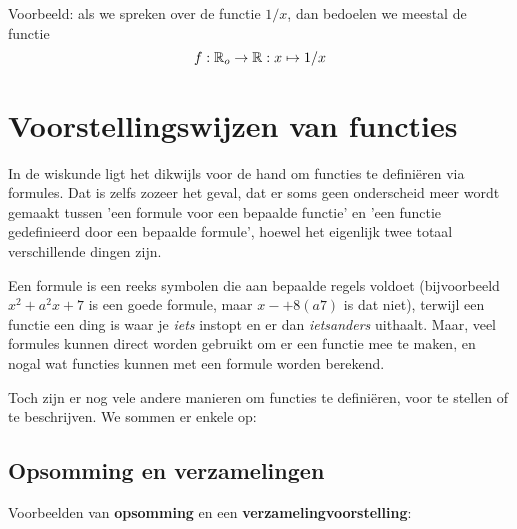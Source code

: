 \documentclass{ximera}
\begin{document}
Voorbeeld: als we spreken over de functie $1/x$, dan bedoelen we meestal de functie
$$
f: \mathbb{R}_o \to \mathbb{R}: x\mapsto 1/x
$$






\section{Voorstellingswijzen van functies}
In de wiskunde ligt het dikwijls voor de hand om functies te definiëren via formules. Dat is zelfs zozeer het geval, dat er soms geen onderscheid meer wordt gemaakt tussen 'een formule voor een bepaalde functie' en 'een functie gedefinieerd door een bepaalde formule', hoewel het eigenlijk twee totaal verschillende dingen zijn. 

Een formule is een reeks symbolen die aan bepaalde regels voldoet (bijvoorbeeld $x^2 + a^2x + 7$ is een goede formule, maar $x-+8(a7)$ is dat niet), terwijl een functie een ding is waar je \textit{iets} instopt en er dan \textit{ietsanders} uithaalt. Maar, veel formules kunnen direct worden gebruikt om er een functie mee te maken, en nogal wat functies kunnen met een formule worden berekend. 

Toch zijn er nog vele andere manieren om functies te definiëren, voor te stellen of te beschrijven. We sommen er enkele op:

\subsection{Opsomming en verzamelingen}
Voorbeelden van \textbf{opsomming} en een \textbf{verzamelingvoorstelling}:
\end{document}
